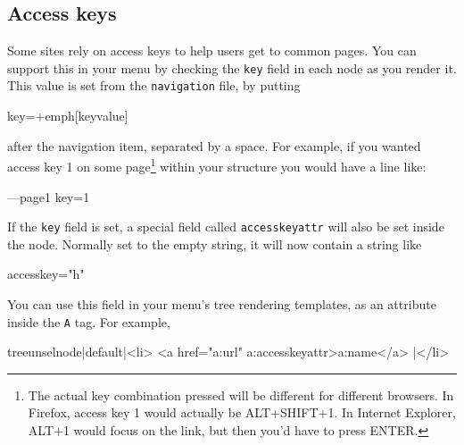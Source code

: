 \subsection{Access keys}
Some sites rely on access keys to help users get to common pages. You can support this in your
menu by checking the \texttt{key} field in each node as you render it. This value is set from
the \texttt{navigation} file, by putting
\begin{MyVerbatim}[commandchars=+\[\]]
key=+emph[keyvalue]
\end{MyVerbatim}
after the navigation item, separated by a space. For example, if you wanted access key 1 on some
page\footnote{The
actual key combination pressed will be different for different browsers.
In Firefox, access key 1 would actually be ALT+SHIFT+1. In Internet Explorer, ALT+1 would
focus on the link, but then you'd have to press ENTER.} within your structure
you would have a line like:
\begin{MyVerbatim}
---page1 key=1
\end{MyVerbatim}
If the \texttt{key} field is set, a special field called \texttt{accesskeyattr} will also be set inside
the node. Normally set to the empty string, it will now contain a string like
\begin{MyVerbatim}
accesskey="h"
\end{MyVerbatim}
You can use this field in your menu's tree rendering templates, as an attribute
inside the \texttt{A} tag. For example,
\begin{MyVerbatim}
{{treeunselnode|default|<li>
  <a href="{{a:url}}" {{a:accesskeyattr}}>{{a:name}}</a>
  |</li>}}
\end{MyVerbatim}


